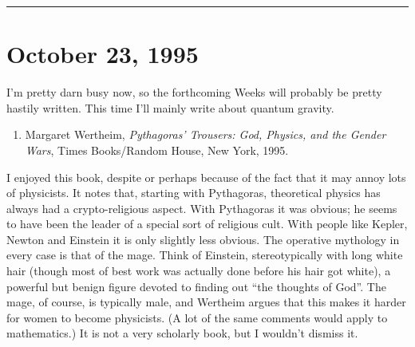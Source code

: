 \documentclass{article}
\def\tightlist{}
\renewcommand{\texttt}[1]{%
  \begingroup
  \ttfamily
  \begingroup\lccode`~=`/\lowercase{\endgroup\def~}{/\discretionary{}{}{}}%
  \begingroup\lccode`~=`[\lowercase{\endgroup\def~}{[\discretionary{}{}{}}%
  \begingroup\lccode`~=`.\lowercase{\endgroup\def~}{.\discretionary{}{}{}}%
  \catcode`/=\active\catcode`[=\active\catcode`.=\active
  \scantokens{#1\noexpand}%
  \endgroup
}
\begin{document}
\begin{center}\rule{0.5\linewidth}{0.5pt}\end{center}
\hypertarget{week67}{%
\section{October 23, 1995}\label{week67}}

I'm pretty darn busy now, so the forthcoming Weeks will probably be
pretty hastily written. This time I'll mainly write about quantum
gravity.

\begin{enumerate}
\def\labelenumi{\arabic{enumi})}
\tightlist
\item
  Margaret Wertheim, \emph{Pythagoras' Trousers: God, Physics, and the
  Gender Wars}, Times Books/Random House, New York, 1995.
\end{enumerate}

I enjoyed this book, despite or perhaps because of the fact that it may
annoy lots of physicists. It notes that, starting with Pythagoras,
theoretical physics has always had a crypto-religious aspect. With
Pythagoras it was obvious; he seems to have been the leader of a special
sort of religious cult. With people like Kepler, Newton and Einstein it
is only slightly less obvious. The operative mythology in every case is
that of the mage. Think of Einstein, stereotypically with long white
hair (though most of best work was actually done before his hair got
white), a powerful but benign figure devoted to finding out ``the
thoughts of God''. The mage, of course, is typically male, and Wertheim
argues that this makes it harder for women to become physicists. (A lot
of the same comments would apply to mathematics.) It is not a very
scholarly book, but I wouldn't dismiss it.

\end{document}
